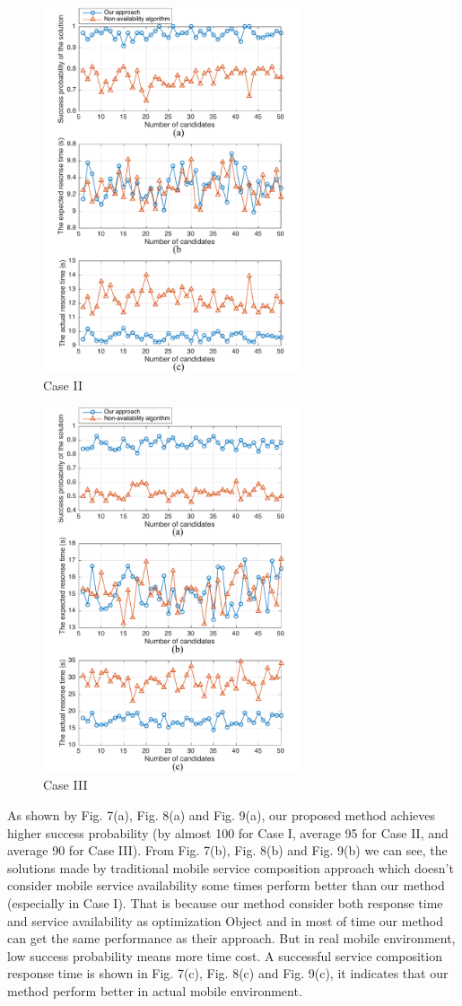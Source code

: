 \documentclass[10pt,journal,compsoc]{IEEEtran}
\begin{document}
\begin{figure}[!t]
\centering
\includegraphics[width=3in]{./img/Task-12.pdf}
\caption{Case II}
\label{Task-12}
\end{figure}

\begin{figure}[!t]
\centering
\includegraphics[width=3in]{./img/Task-24.pdf}
\caption{Case III}
\label{Task-24}
\end{figure}

As shown by Fig. 7(a), Fig. 8(a) and Fig. 9(a), our proposed method achieves higher success probability (by almost 100%
for Case I, average 95%
for Case II, and average 90%
for Case III). From Fig. 7(b), Fig. 8(b) and Fig. 9(b) we can see, the solutions made by traditional mobile service composition approach which doesn't consider mobile service availability some times perform better than our method (especially in Case I). That is because our method consider both response time and service availability as optimization Object and in most of time our method can get the same performance as their approach. But in real mobile environment, low success probability means more time cost. A successful service composition response time is shown in Fig. 7(c), Fig. 8(c) and Fig. 9(c), it indicates that our method perform better in actual mobile environment.
\end{document}
